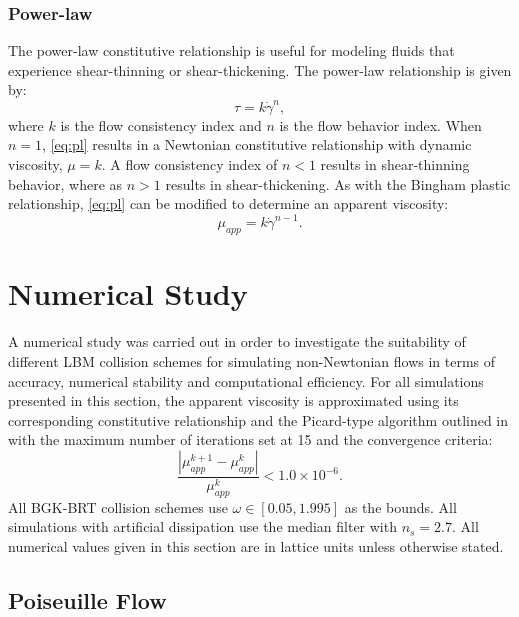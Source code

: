 \documentclass[pdftex,ms]{pittetd}
\begin{document}
\subsubsection{Power-law}

The power-law constitutive relationship is useful for modeling fluids that experience shear-thinning or shear-thickening.
The power-law relationship is given by:
\begin{equation} \label{eq:pl}
\tau = k \dot{\gamma}^n,
\end{equation}
\noindent where $k$ is the flow consistency index and $n$ is the flow behavior index.
When $n = 1$, \eqref{eq:pl} results in a Newtonian constitutive relationship with dynamic viscosity, $\mu = k$.
A flow consistency index of $n < 1$ results in shear-thinning behavior, where as $n > 1$ results in shear-thickening.
As with the Bingham plastic relationship, \eqref{eq:pl} can be modified to determine an apparent viscosity:
\begin{equation} \label{eq:pl-mu-app}
\mu_{app} = k \dot{\gamma}^{n-1}.
\end{equation}

\section{Numerical Study}

A numerical study was carried out in order to investigate the suitability of different LBM collision schemes for simulating non-Newtonian flows in terms of accuracy, numerical stability and computational efficiency.
For all simulations presented in this section, the apparent viscosity is approximated using its corresponding constitutive relationship and the Picard-type algorithm outlined in  with the maximum number of iterations set at 15 and the convergence criteria:
\begin{equation} \label{eq:mu-app-conv}
\frac{\left|\mu_{app}^{k+1} - \mu_{app}^{k}\right|}{\mu_{app}^{k}} < 1.0 \times 10^{-6}.
\end{equation}
All BGK-BRT collision schemes use $\omega \in [0.05, 1.995]$ as the bounds.
All simulations with artificial dissipation use the median filter with $n_s = 2.7$.
All numerical values given in this section are in lattice units unless otherwise stated.

\newcommand{\pgrad}{\frac{\partial p}{\partial x}}

\subsection{Poiseuille Flow}
\end{document}

